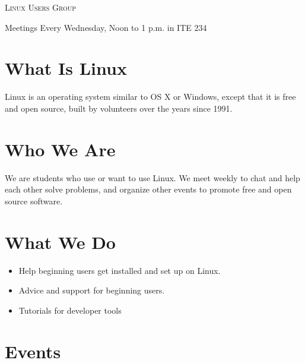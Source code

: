 \documentclass[11pt]{article}
\begin{document}
\begin{multicols*}{2}

\begin{center} \scshape \Huge
    \phantom{x}
    Linux Users Group
\end{center}

\begin{center} \Large
    Meetings
    Every Wednesday, Noon to 1 p.m. in ITE 234
\end{center}

\section*{What Is Linux}

Linux is an operating system similar to OS X or Windows, except that it is free
and open source, built by volunteers over the years since 1991.

\section*{Who We Are}

We are students who use or want to use Linux. We meet weekly to chat and help
each other solve problems, and organize other events to promote free and open
source software.


\section*{What We Do}


\begin{itemize} \large
\item Help beginning users get installed and set up on Linux.
\item Advice and support for beginning users.
\item Tutorials for developer tools
\end{itemize}

\section*{Events}


\end{multicols*}
\end{document}
